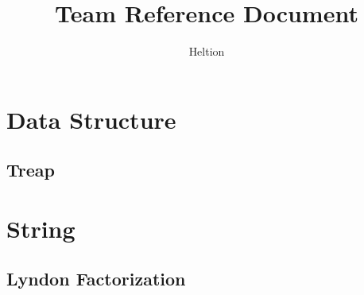 \documentclass{article}
\begin{document}
\title{Team Reference Document}
\author{Heltion}
\maketitle
\newpage
\begin{multicols}{2}
    \tableofcontents
    \newpage
    \section{Data Structure}
    \subsection{Treap}
    
    \section{String}
    \subsection{Lyndon Factorization}
    
\end{multicols}
\end{document}
